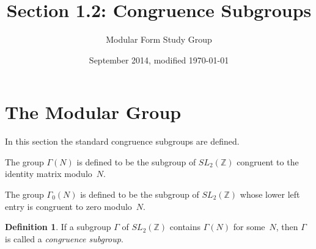 \documentclass{article}
\theoremstyle{plain}
\theoremstyle{definition}
\newtheorem{definition}[theorem]{Definition}
\theoremstyle{remark}
\newcommand{\Z}{\mathbb{Z}}
\begin{document}
 


\title{Section 1.2: Congruence Subgroups}

\author{Modular Form Study Group}

\date{September 2014, modified \today}

\maketitle


\section{The Modular Group}

In this section the standard congruence subgroups are defined.

The group $\Gamma(N)$ is defined to be the subgroup of $SL_2(\Z)$
congruent to the identity matrix modulo~$N$.

The group $\Gamma_0(N)$ is defined to be the subgroup of $SL_2(\Z)$
whose lower left entry is congruent to zero modulo~$N$.

\begin{definition}
If a subgroup $\Gamma$ of $SL_2(\Z)$ contains
$\Gamma(N)$ for some~$N$, then $\Gamma$ is called a \emph{congruence subgroup}.
\end{definition}
\end{document}
